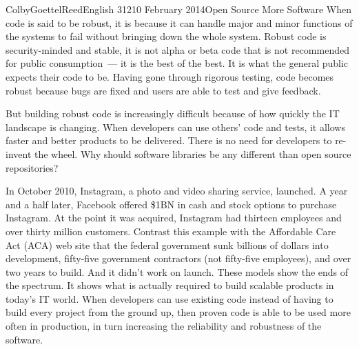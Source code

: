\documentclass[12pt]{article}
\begin{document}
\begin{mla}{Colby}{Goettel}{Reed}{English 312}{10 February 2014}{Open Source More Software}
When code is said to be robust, it is because it can handle major and minor functions of the systems to fail without bringing down the whole system. Robust code is security-minded and stable, it is not alpha or beta code that is not recommended for public consumption~--- it is the best of the best. It is what the general public expects their code to be. Having gone through rigorous testing, code becomes robust because bugs are fixed and users are able to test and give feedback.

But building robust code is increasingly difficult because of how quickly the IT landscape is changing. When developers can use others' code and tests, it allows faster and better products to be delivered. There is no need for developers to re-invent the wheel. Why should software libraries be any different than open source repositories?

In October 2010, Instagram, a photo and video sharing service, launched. A year and a half later, Facebook offered \$1BN in cash and stock options to purchase Instagram. At the point it was acquired, Instagram had thirteen employees and over thirty million customers. Contrast this example with the Affordable Care Act (ACA) web site that the federal government sunk billions of dollars into development, fifty-five government contractors (not fifty-five employees), and over two years to build. And it didn't work on launch. These models show the ends of the spectrum. It shows what is actually required to build scalable products in today's IT world. When developers can use existing code instead of having to build every project from the ground up, then proven code is able to be used more often in production, in turn increasing the reliability and robustness of the software.


\end{mla}
\end{document}
